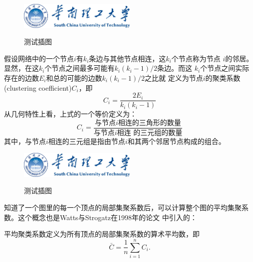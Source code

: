 \documentclass[phd,nobackinfo]{scutthesis}
\begin{document}
\begin{definition}[局部聚类系数]


\begin{figure}[htbp]
  \centering
  \includegraphics[width= 0.5\textwidth]{scutlogo.eps}\\
  \caption{测试插图}\label{fig:test5}
\end{figure}

假设网络中的一个节点$i$有$k_i$条边与其他节点相连，这$k_i$个节点称为节点
$i$的邻居。显然，在这$k_i$个节点之间最多可能有$k_i(k_i-1)/2$条边。而这
$k_i$个节点之间实际存在的边数$E_i$和总的可能的边数$k_i(k_i-1)/2$之比就
定义为节点$i$的聚类系数(clustering coefficient)$C_i$，即
\begin{equation}\label{eq:clustering_coefficient}
    C_i = \frac{2E_i}{k_i(k_i-1)}
\end{equation}
从几何特性上看，上式的一个等价定义为：
\begin{equation}\label{eq:clustering_coefficient_triangle}
    C_i = \frac{\text{与节点$i$相连的三角形的数量}}{\text{与节点$i$相连
        的三元组的数量}}
\end{equation}
其中，与节点$i$相连的三元组是指由节点$i$和其两个邻居节点构成的组合。
\end{definition}

\begin{figure}[htbp]
  \centering
  \includegraphics[width= 0.5\textwidth]{scutlogo.eps}\\
  \caption{测试插图}\label{fig:test6}
\end{figure}

知道了一个图里的每一个顶点的局部集聚系数后，可以计算整个图的平均集聚系
数。这个概念也是Watts与Strogatz在1998年的论文
\cite{watts1998smallworld}中引入的：

\begin{definition}[平均聚类系数]
平均聚类系数定义为所有顶点的局部集聚系数的算术平均数，即
\begin{equation}
    \bar{C} = \frac{1}{n}\sum_{i=1}^{n} C_i.
\end{equation}
\end{definition}
\end{document}
